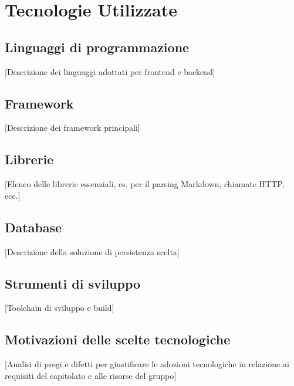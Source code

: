 \section{Tecnologie Utilizzate}

\subsection{Linguaggi di programmazione}
[Descrizione dei linguaggi adottati per frontend e backend]

\subsection{Framework}
[Descrizione dei framework principali]

\subsection{Librerie}
[Elenco delle librerie essenziali, es. per il parsing Markdown, chiamate HTTP, ecc.]

\subsection{Database}
[Descrizione della soluzione di persistenza scelta]

\subsection{Strumenti di sviluppo}
[Toolchain di sviluppo e build]

\subsection{Motivazioni delle scelte tecnologiche}
[Analisi di pregi e difetti per giustificare le adozioni tecnologiche in relazione ai requisiti del capitolato e alle risorse del gruppo]